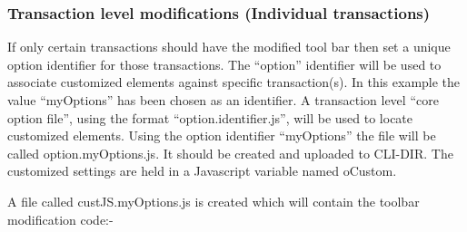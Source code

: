 \documentclass[letterpaper,10pt,english]{sphinxmanual}
\begin{document}


\subsubsection{Transaction level modifications (Individual transactions)}
\label{\detokenize{User_Guide:transaction-level-modifications-individual-transactions}}
If only certain transactions should have the modified tool bar then set a unique option identifier for those transactions. The “option” identifier will be used to associate customized elements against specific transaction(s). In this example the value “myOptions” has been chosen as an identifier. A transaction level “core option file”, using the format “option.identifier.js”, will be used to locate customized elements. Using the option identifier “myOptions” the file will be called option.myOptions.js. It should be created and uploaded to CLI-DIR. The customized settings are held in a Javascript variable named oCustom.

\begin{sphinxVerbatim}[commandchars=\\\{\}]
       
 
\end{sphinxVerbatim}

A file called custJS.myOptions.js is created which will contain the toolbar modification code:-

\begin{sphinxVerbatim}[commandchars=\\\{\}]
  
    
  
\end{sphinxVerbatim}
\end{document}
